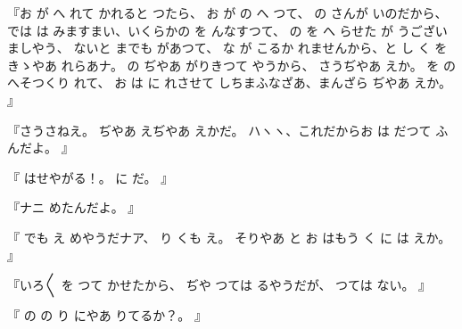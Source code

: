 『お
が
へ
れて
かれると
つたら、
お
が
の
へ
つて、
の
さんが
いのだから、
では
は
みますまい、いくらかの
を
んなすつて、
の
を
へ
らせた
が
うございましやう、
ないと
までも
があつて、
な
が
こるか
れませんから、と
し
く
をきゝやあ
れらあナ。
の
ぢやあ
がりきつて
やうから、
さうぢやあ
えか。
を
の
へそつくり
れて、
お
は
に
れさせて
しちまふなざあ、まんざら
ぢやあ
えか。
』

『さうさねえ。
ぢやあ
えぢやあ
えかだ。
ハヽヽ、これだからお
は
だつて
ふんだよ。
』

『
はせやがる！。
に
だ。
』

『ナニ
めたんだよ。
』

『
でも
え
めやうだナア、
り
くも
え。
そりやあ
と
お
はもう
く
に
は
えか。
』

『いろ〳〵
を
つて
かせたから、
ぢや
つては
るやうだが、
つては
ない。
』

『
の
の
り
にやあ
りてるか？。
』

